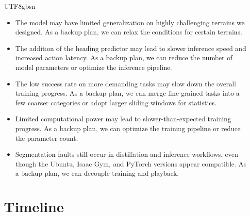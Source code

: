 \documentclass[conference]{IEEEtran}
\begin{document}
\begin{CJK}{UTF8}{gbsn}
\begin{itemize}
    \item The model may have limited generalization on highly challenging terrains we designed. As a backup plan, we can relax the conditions for certain terrains.
    \item The addition of the heading predictor may lead to slower inference speed and increased action latency. As a backup plan, we can reduce the number of model parameters or optimize the inference pipeline.
    \item The low success rate on more demanding tasks may slow down the overall training progress. As a backup plan, we can merge fine-grained tasks into a few coarser categories or adopt larger sliding windows for statistics.
    \item Limited computational power may lead to slower-than-expected training progress. As a backup plan, we can optimize the training pipeline or reduce the parameter count.
    \item Segmentation faults still occur in distillation and inference workflows, even though the Ubuntu, Isaac Gym, and PyTorch versions appear compatible. As a backup plan, we can decouple training and playback. 
\end{itemize}









\section{Timeline}


\end{CJK}
\end{document}
